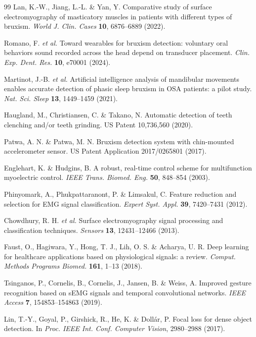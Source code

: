 \documentclass[pdflatex,sn-nature,iicol]{sn-jnl}
\begin{document}
\begin{thebibliography}{99}
Lan, K.-W., Jiang, L.-L. \& Yan, Y. Comparative study of surface electromyography of masticatory muscles in patients with different types of bruxism. \emph{World J. Clin. Cases} \textbf{10}, 6876--6889 (2022).

Romano, F. \emph{et al.} Toward wearables for bruxism detection: voluntary oral behaviors sound recorded across the head depend on transducer placement. \emph{Clin. Exp. Dent. Res.} \textbf{10}, e70001 (2024).

Martinot, J.-B. \emph{et al.} Artificial intelligence analysis of mandibular movements enables accurate detection of phasic sleep bruxism in OSA patients: a pilot study. \emph{Nat. Sci. Sleep} \textbf{13}, 1449--1459 (2021).

Haugland, M., Christiansen, C. \& Takano, N. Automatic detection of teeth clenching and/or teeth grinding. US Patent 10,736,560 (2020).

Patwa, A. N. \& Patwa, M. N. Bruxism detection system with chin-mounted accelerometer sensor. US Patent Application 2017/0265801 (2017).

Englehart, K. \& Hudgins, B. A robust, real-time control scheme for multifunction myoelectric control. \emph{IEEE Trans. Biomed. Eng.} \textbf{50}, 848--854 (2003).

Phinyomark, A., Phukpattaranont, P. \& Limsakul, C. Feature reduction and selection for EMG signal classification. \emph{Expert Syst. Appl.} \textbf{39}, 7420--7431 (2012).

Chowdhury, R. H. \emph{et al.} Surface electromyography signal processing and classification techniques. \emph{Sensors} \textbf{13}, 12431--12466 (2013).

Faust, O., Hagiwara, Y., Hong, T. J., Lih, O. S. \& Acharya, U. R. Deep learning for healthcare applications based on physiological signals: a review. \emph{Comput. Methods Programs Biomed.} \textbf{161}, 1--13 (2018).

Tsinganos, P., Cornelis, B., Cornelis, J., Jansen, B. \& Weiss, A. Improved gesture recognition based on sEMG signals and temporal convolutional networks. \emph{IEEE Access} \textbf{7}, 154853--154863 (2019).

Lin, T.-Y., Goyal, P., Girshick, R., He, K. \& Doll\'ar, P. Focal loss for dense object detection. In \emph{Proc. IEEE Int. Conf. Computer Vision}, 2980--2988 (2017).


\end{thebibliography}
\end{document}
